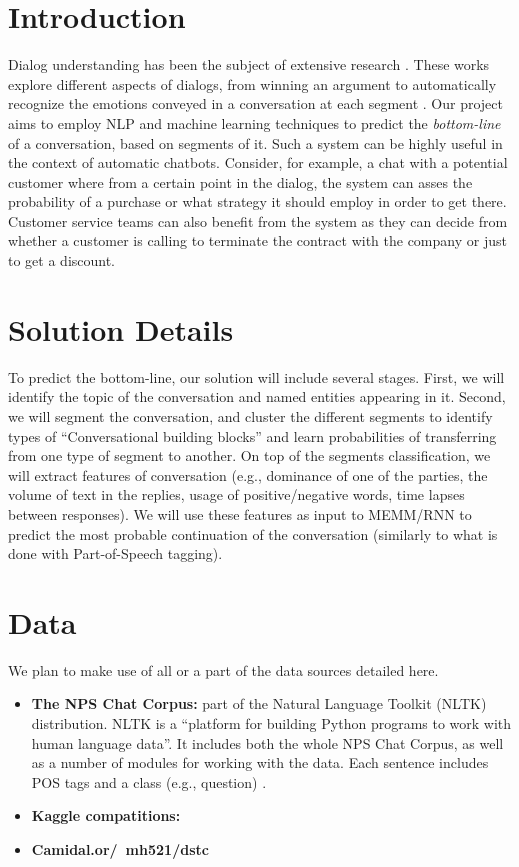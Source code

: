 \section{Introduction}
Dialog understanding has been the subject of 
extensive research \cite{BohusR03,BordesW16,GhazvininejadBC17,ShawarA03}. These works explore 
different aspects of dialogs, from winning an argument \cite{TanNDL16} 
to automatically recognize the emotions conveyed in a conversation at each segment \cite{AyadiKK11}. 
Our project aims to employ NLP and machine learning techniques to 
predict the {\em bottom-line} of a conversation, based on segments 
of it. Such a system can be highly useful in the context of automatic 
chatbots. Consider, for example, a chat with a potential customer where 
from a certain point in the dialog, the system can asses the probability of a purchase 
or what strategy it should employ in order to get there. 
Customer service teams can also benefit from the system as they can decide 
from whether a customer is calling to terminate the contract with the company 
or just to get a discount.

\section{Solution Details}
To predict the bottom-line, our solution will include several stages. 
First, we will identify the topic of the conversation and named entities 
appearing in it. Second, we will segment the conversation, 
and cluster the different segments to identify types of 
``Conversational building blocks'' and learn probabilities 
of transferring from one type of segment to another. 
On top of the segments classification, we will extract features of 
conversation (e.g., dominance of one of the parties, 
the volume of text in the replies, usage of positive/negative words, 
time lapses between responses). 
We will use these features as input to MEMM/RNN to predict the 
most probable continuation of the conversation 
(similarly to what is done with Part-of-Speech tagging). 


\section{Data}
We plan to make use of all or a part of the data sources detailed here. 
\begin{itemize}
	\item {\bf The NPS Chat Corpus:} part of the Natural Language Toolkit (NLTK) distribution. 
	NLTK is a ``platform for building Python programs to work with human language data''. 
	It includes both the whole NPS Chat Corpus, as well as a number of modules for working with the data. 
	Each sentence includes POS tags and a class (e.g., question) \cite{NPS}.

	\item {\bf Kaggle compatitions: }

	\item {\bf Camidal.or/~mh521/dstc}
\end{itemize}
